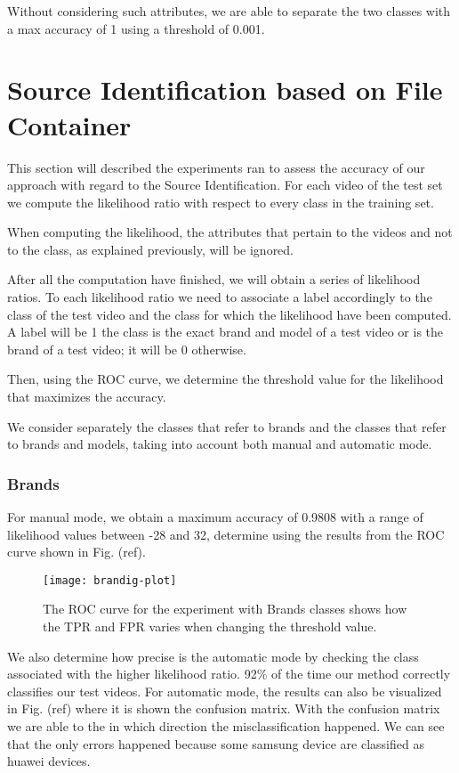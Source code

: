 Without considering such attributes, we are able to separate the two classes with a max accuracy of 1 using a threshold of 0.001.

\section{Source Identification based on File Container}

This section will described the experiments ran to assess the accuracy of our approach with regard to the Source Identification. For each video of the test set we compute the likelihood ratio with respect to every class in the training set. 

When computing the likelihood, the attributes that pertain to the videos and not to the class, as explained previously, will be ignored.

After all the computation have finished, we will obtain a series of likelihood ratios. To each likelihood ratio we need to associate a label accordingly to the class of the test video and the class for which the likelihood have been computed. A label will be 1 the class is the exact brand and model of a test video or is the brand of a test video; it will be 0 otherwise.

Then, using the ROC curve, we determine the threshold value for the likelihood that maximizes the accuracy.

We consider separately the classes that refer to brands and the classes that refer to brands and models, taking into account both manual and automatic mode.

\subsubsection*{Brands}

For manual mode, we obtain a maximum accuracy of 0.9808 with a range of likelihood values between -28 and 32, determine using the results from the ROC curve shown in Fig. (ref).

\begin{figure}
  \centering
  \texttt{[image: brandig-plot]}
  \caption{The ROC curve for the experiment with Brands classes shows how the TPR and FPR varies when changing the threshold value.}\label{fig:brand-roc}
\end{figure}

We also determine how precise is the automatic mode by checking the class associated with the higher likelihood ratio. 92\% of the time our method correctly classifies our test videos. For automatic mode, the results can also be visualized in Fig. (ref) where it is shown the confusion matrix. With the confusion matrix we are able to the in which direction the misclassification happened. We can see that the only errors happened because some samsung device are classified as huawei devices. 

